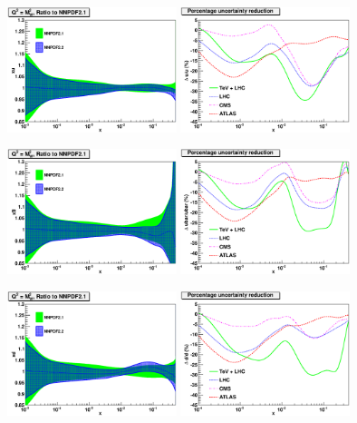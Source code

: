 \begin{figure}[hp!]
  \centering
  \includegraphics[width=0.44\textwidth]{6-LHCimpact/figs/xu-nnpdf22.eps}
    \includegraphics[width=0.44\textwidth]{6-LHCimpact/figs/u-perc.eps}

  \includegraphics[width=0.44\textwidth]{6-LHCimpact/figs/xubar-nnpdf22.eps}
    \includegraphics[width=0.44\textwidth]{6-LHCimpact/figs/ubar-perc.eps}

  \includegraphics[width=0.44\textwidth]{6-LHCimpact/figs/xd-nnpdf22.eps}
    \includegraphics[width=0.44\textwidth]{6-LHCimpact/figs/d-perc.eps}


\end{figure}
